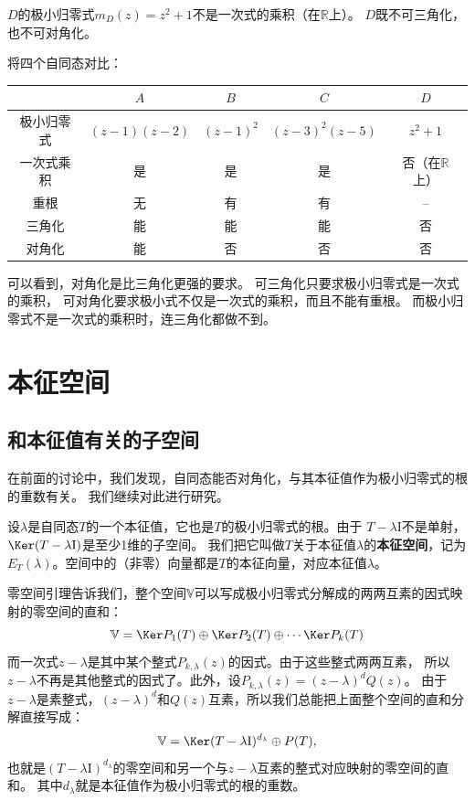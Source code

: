 \documentclass[12pt,UTF8]{ctexbook}
\begin{document}
$D$的极小归零式$m_D(z) = z^2 + 1$不是一次式的乘积（在$\mathbb{R}$上）。
$D$既不可三角化，也不可对角化。

将四个自同态对比：
\begin{center}
\begin{tabular}{|c|c|c|c|c|}
\hline
 & $A$ & $B$ & $C$ & $D$ \\
\hline
极小归零式 & $(z-1)(z-2)$ & $(z-1)^2$ & $(z-3)^2(z-5)$ & $z^2+1$ \\
\hline
一次式乘积 & 是 & 是 & 是 & 否（在$\mathbb{R}$上） \\
\hline
重根 & 无 & 有 & 有 & -- \\
\hline
三角化 & 能 & 能 & 能 & 否 \\
\hline
对角化 & 能 & 否 & 否 & 否 \\
\hline
\end{tabular}
\end{center}

可以看到，对角化是比三角化更强的要求。
可三角化只要求极小归零式是一次式的乘积，
可对角化要求极小式不仅是一次式的乘积，而且不能有重根。
而极小归零式不是一次式的乘积时，连三角化都做不到。

\section{本征空间}
\subsection{和本征值有关的子空间}
在前面的讨论中，我们发现，自同态能否对角化，与其本征值作为极小归零式的根的重数有关。
我们继续对此进行研究。

设$\lambda$是自同态$T$的一个本征值，它也是$T$的极小归零式的根。由于
$T - \lambda \mathrm{I}$不是单射，$\Ker (T - \lambda \mathrm{I})$是至少1维的子空间。
我们把它叫做$T$关于本征值$\lambda$的\textbf{本征空间}，记为$E_T(\lambda)$。空间中的（非零）向量都是$T$的本征向量，对应本征值$\lambda$。

零空间引理告诉我们，整个空间$\mathbb{V}$可以写成极小归零式分解成的两两互素的因式映射的零空间的直和：
$$ \mathbb{V} = \Ker P_1(T) \oplus \Ker P_2(T) \oplus \cdots \Ker P_k(T)$$
而一次式$z - \lambda$是其中某个整式$P_{k,\lambda}(z)$的因式。由于这些整式两两互素，
所以$z - \lambda$不再是其他整式的因式了。此外，设$P_{k,\lambda}(z) = (z - \lambda)^{d} Q(z)$。
由于$z - \lambda$是素整式，$(z - \lambda)^{d}$和$Q(z)$互素，所以我们总能把上面整个空间的直和分解直接写成：
$$ \mathbb{V} = \Ker (T - \lambda\mathrm{I})^{d_\lambda} \oplus P(T),$$
也就是$(T - \lambda\mathrm{I})^{d_\lambda}$的零空间和另一个与$z - \lambda$互素的整式对应映射的零空间的直和。
其中$d_\lambda$就是本征值作为极小归零式的根的重数。
\end{document}
